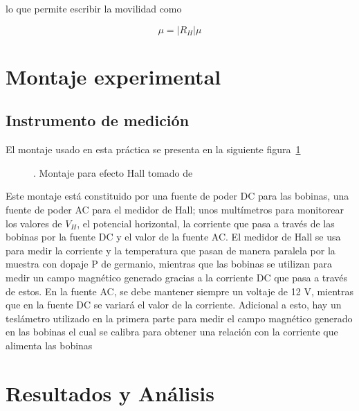 \documentclass[%
 reprint,
 amsmath,amssymb,
 aps,
]{revtex4-1}
\begin{document}
lo que permite escribir la movilidad como 

\begin{equation*}
    \mu=|R_H|\mu
\end{equation*}

\section{Montaje experimental}
\subsection{Instrumento de medición}

El montaje usado en esta práctica se presenta en la siguiente figura~\ref{montaje Hall}

\begin{figure}[h]
\caption{\label{montaje Hall}. Montaje para efecto Hall tomado de~\cite{guia hall}}
\end{figure}

Este montaje está constituido por una fuente de poder DC para las bobinas, una fuente de poder AC para el medidor de Hall; unos multímetros para monitorear los valores de $V_H$, el potencial horizontal, la corriente que pasa a través de las bobinas por la fuente DC y el valor de la fuente AC. El medidor de Hall se usa para medir la corriente y la temperatura que pasan de manera paralela por la muestra con dopaje P de germanio, mientras que las bobinas se utilizan para medir un campo magnético generado gracias a la corriente DC que pasa a través de estos. En la fuente AC, se debe mantener siempre un voltaje de 12 V, mientras que en la fuente DC se variará el valor de la corriente. Adicional a esto, hay un teslámetro utilizado en la primera parte para medir el campo magnético generado en las bobinas el cual se calibra para obtener una relación con la corriente que alimenta las bobinas

\section{Resultados y Análisis}
\end{document}
